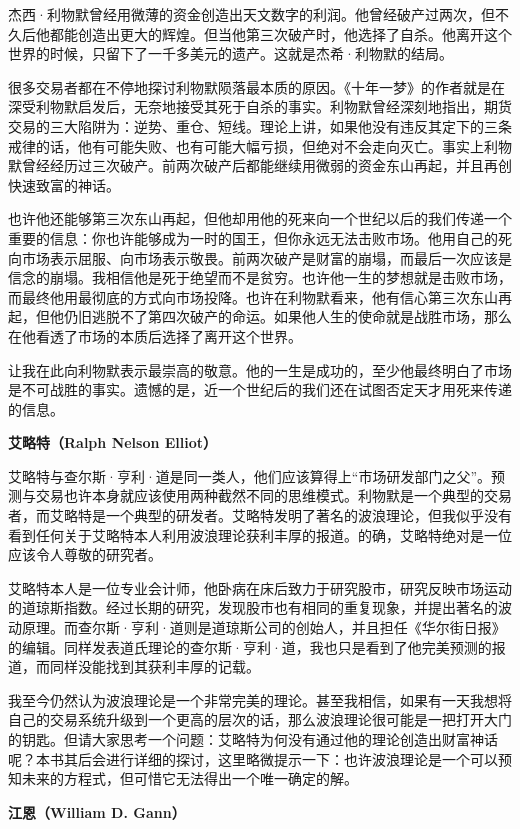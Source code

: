 杰西·利物默曾经用微薄的资金创造出天文数字的利润。他曾经破产过两次，但不久后他都能创造出更大的辉煌。但当他第三次破产时，他选择了自杀。他离开这个世界的时候，只留下了一千多美元的遗产。这就是杰希·利物默的结局。

很多交易者都在不停地探讨利物默陨落最本质的原因。《十年一梦》的作者就是在深受利物默启发后，无奈地接受其死于自杀的事实。利物默曾经深刻地指出，期货交易的三大陷阱为：逆势、重仓、短线。理论上讲，如果他没有违反其定下的三条戒律的话，他有可能失败、也有可能大幅亏损，但绝对不会走向灭亡。事实上利物默曾经经历过三次破产。前两次破产后都能继续用微弱的资金东山再起，并且再创快速致富的神话。

也许他还能够第三次东山再起，但他却用他的死来向一个世纪以后的我们传递一个重要的信息：你也许能够成为一时的国王，但你永远无法击败市场。他用自己的死向市场表示屈服、向市场表示敬畏。前两次破产是财富的崩塌，而最后一次应该是信念的崩塌。我相信他是死于绝望而不是贫穷。也许他一生的梦想就是击败市场，而最终他用最彻底的方式向市场投降。也许在利物默看来，他有信心第三次东山再起，但他仍旧逃脱不了第四次破产的命运。如果他人生的使命就是战胜市场，那么在他看透了市场的本质后选择了离开这个世界。

让我在此向利物默表示最崇高的敬意。他的一生是成功的，至少他最终明白了市场是不可战胜的事实。遗憾的是，近一个世纪后的我们还在试图否定天才用死来传递的信息。

\textbf{艾略特（Ralph Nelson Elliot）}

艾略特与查尔斯·亨利·道是同一类人，他们应该算得上“市场研发部门之父”。预测与交易也许本身就应该使用两种截然不同的思维模式。利物默是一个典型的交易者，而艾略特是一个典型的研发者。艾略特发明了著名的波浪理论，但我似乎没有看到任何关于艾略特本人利用波浪理论获利丰厚的报道。的确，艾略特绝对是一位应该令人尊敬的研究者。

艾略特本人是一位专业会计师，他卧病在床后致力于研究股市，研究反映市场运动的道琼斯指数。经过长期的研究，发现股市也有相同的重复现象，并提出著名的波动原理。而查尔斯·亨利·道则是道琼斯公司的创始人，并且担任《华尔街日报》的编辑。同样发表道氏理论的查尔斯·亨利·道，我也只是看到了他完美预测的报道，而同样没能找到其获利丰厚的记载。

我至今仍然认为波浪理论是一个非常完美的理论。甚至我相信，如果有一天我想将自己的交易系统升级到一个更高的层次的话，那么波浪理论很可能是一把打开大门的钥匙。但请大家思考一个问题：艾略特为何没有通过他的理论创造出财富神话呢？本书其后会进行详细的探讨，这里略微提示一下：也许波浪理论是一个可以预知未来的方程式，但可惜它无法得出一个唯一确定的解。

\textbf{江恩（William D. Gann）}

